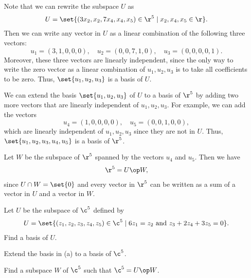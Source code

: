 \begin{sole}
    \item Note that we can rewrite the subspace $U$ as
    \[U = \set{(3x_2, x_2, 7x_4, x_4, x_5) \in \r^5 \mid x_2, x_4, x_5 \in \r}.\]
    Then we can write any vector in $U$ as a linear combination of the following three vectors:
    \[u_1 = (3, 1, 0, 0, 0), \quad u_2 = (0, 0, 7, 1, 0), \quad u_3 = (0, 0, 0, 0, 1).\]
    Moreover, these three vectors are linearly independent, since the only way to write the zero vector as a linear combination of $u_1, u_2, u_3$ is to take all coefficients to be zero. Thus, $\set{u_1, u_2, u_3}$ is a basis of $U$.
    \item We can extend the basis $\set{u_1, u_2, u_3}$ of $U$ to a basis of $\r^5$ by adding two more vectors that are linearly independent of $u_1, u_2, u_3$. For example, we can add the vectors
    \[u_4 = (1, 0, 0, 0, 0), \quad u_5 = (0, 0, 1, 0, 0),\]
    which are linearly independent of $u_1, u_2, u_3$ since they are not in $U$. Thus, $\set{u_1, u_2, u_3, u_4, u_5}$ is a basis of $\r^5$.
    \item Let $W$ be the subspace of $\r^5$ spanned by the vectors $u_4$ and $u_5$. Then we have
    \[\r^5 = U \op W,\]
    since $U \cap W = \set{0}$ and every vector in $\r^5$ can be written as a sum of a vector in $U$ and a vector in $W$.
\end{sole}

\begin{exercise}[2b4]
    \begin{subexercises}
        \item Let $U$ be the subspace of $\c^5$ defined by
        \[U = \set{(z_1, z_2, z_3, z_4, z_5) \in \c^5 \mid 6z_1 = z_2 \text{ and } z_3 + 2z_4 + 3z_5 = 0}.\]
        Find a basis of $U$.
        \item Extend the basis in (a) to a basis of $\c^5$.
        \item Find a subspace $W$ of $\c^5$ such that $\c^5 = U \op W$.
    \end{subexercises}
\end{exercise}

